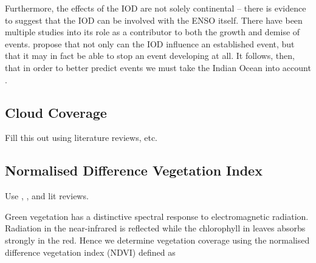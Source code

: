 Furthermore, the effects of the IOD are not solely continental -- there is
evidence to suggest that the IOD can be involved with the ENSO itself. There
have been multiple studies into its role as a contributor to both the growth
\citep{annamalai2005, hackert2017} and demise \citep{okumura2010, kug2006,
  xie2009, dayan2015} of \elnino{} events. \cite{dong2018} propose that not only
can the IOD influence an established \elnino{} event, but that it may in fact be
able to stop an \elnino{} event developing at all. It follows, then, that in
order to better predict \elnino{} events we must take the Indian Ocean into
account \citep{hackert2017}.

\subsection{Cloud Coverage}
\label{sec:intro:cc}

Fill this out using literature reviews, etc.

\subsection{Normalised Difference Vegetation Index}
\label{sec:intro:ndvi}

Use \cite{yengoh2014}, \cite{bannari1995}, and lit reviews.


Green vegetation has a distinctive spectral response to electromagnetic
radiation. Radiation in the near-infrared is reflected while the chlorophyll in
leaves absorbs strongly in the red. Hence we determine vegetation coverage using
the normalised difference vegetation index (NDVI) defined as

